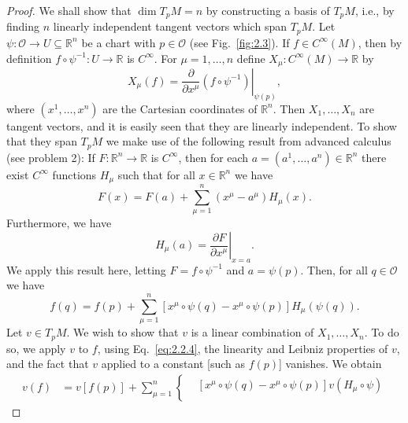 \begin{proof}
We shall show that \(\dim T_pM=n\) by constructing a basis of \(T_pM\), i.e., by
finding \(n\) linearly independent tangent vectors which span \(T_pM\).  Let
\(\psi:\mathcal O\to U\subseteq\mathbb{R}^n\) be a chart with \(p\in\mathcal O\)
(see Fig.~\ref{fig:2.3}).  If \(f\in C^\infty(M)\), then by definition
\(f\circ\psi^{-1}:U\to\mathbb{R}\) is \(C^\infty\).  For
\(\mu=1,\ldots,n\) define \(X_\mu:C^\infty(M)\to\mathbb{R}\) by
\begin{equation}
  X_\mu(f)=
  \left.\frac{\partial}{\partial x^\mu}\left(f\circ\psi^{-1}\right)
  \right|_{\psi(p)} ,
  \tag{2.2.1}\label{eq:2.2.1}
\end{equation}
where \((x^1,\ldots,x^n)\) are the Cartesian coordinates of \(\mathbb{R}^n\).
Then \(X_1,\ldots,X_n\) are tangent vectors, and it is easily seen that they are
linearly independent.  To show that they span \(T_pM\) we make use of the
following result from advanced calculus (see problem 2): If
\(F:\mathbb{R}^n\to\mathbb{R}\) is \(C^\infty\), then for each
\(a=(a^1,\ldots,a^n)\in\mathbb{R}^n\) there exist \(C^\infty\) functions
\(H_\mu\) such that for all \(x\in\mathbb{R}^n\) we have
\begin{equation}
  F(x)=F(a)+\sum_{\mu=1}^n\left(x^\mu-a^\mu\right)H_\mu(x) .
  \tag{2.2.2}\label{eq:2.2.2}
\end{equation}
Furthermore, we have
\begin{equation}
  H_\mu(a)=\left.\frac{\partial F}{\partial x^\mu}\right|_{x=a} .
  \tag{2.2.3}\label{eq:2.2.3}
\end{equation}
We apply this result here, letting \(F=f\circ\psi^{-1}\) and \(a=\psi(p)\).
Then, for all \(q\in\mathcal O\) we have
\begin{equation}
  f(q)=f(p)+\sum_{\mu=1}^n
  \left[x^\mu\circ\psi(q)-x^\mu\circ\psi(p)\right]H_\mu(\psi(q)) .
  \tag{2.2.4}\label{eq:2.2.4}
\end{equation}
Let \(v\in T_pM\).  We wish to show that \(v\) is a linear combination of
\(X_1,\ldots,X_n\).  To do so, we apply \(v\) to \(f\), using
Eq.~\eqref{eq:2.2.4}, the linearity and Leibniz properties of \(v\), and the fact
that \(v\) applied to a constant [such as \(f(p)\)] vanishes.  We obtain
\begin{equation}
\begin{aligned}
  v(f)
  &=v[f(p)]+\left.\sum_{\mu=1}^n\left\{
    \begin{aligned}
      &\left[x^\mu\circ\psi(q)-x^\mu\circ\psi(p)\right]v(H_\mu\circ\psi)\\

\end{aligned}
\end{aligned}
\end{equation}
\end{proof}
